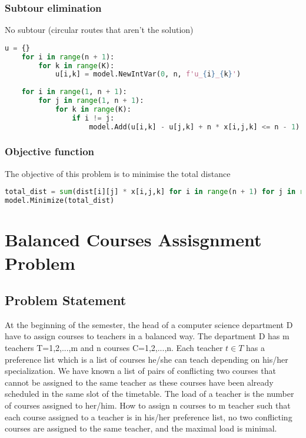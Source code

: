 \documentclass{article}
\begin{document}
\subsubsection{Subtour elimination}
No subtour (circular routes that aren't the solution)
\begin{lstlisting}[language=Python]
    u = {}
    for i in range(n + 1):
        for k in range(K):
            u[i,k] = model.NewIntVar(0, n, f'u_{i}_{k}')
    
    for i in range(1, n + 1):
        for j in range(1, n + 1):
            for k in range(K):
                if i != j:
                    model.Add(u[i,k] - u[j,k] + n * x[i,j,k] <= n - 1)
\end{lstlisting}

\subsubsection{Objective function}
The objective of this problem is to minimise the total distance
\begin{lstlisting}[language=Python]
total_dist = sum(dist[i][j] * x[i,j,k] for i in range(n + 1) for j in range(n + 1) for k in range(K) if i != j)
model.Minimize(total_dist)
\end{lstlisting}

\pagebreak

\section{Balanced Courses Assisgnment Problem}
\subsection{Problem Statement}
At the beginning of the semester, the head of a computer science department D have to assign courses to teachers in a balanced way. The department D has m teachers T={1,2,...,m} and n courses C={1,2,...,n}. Each teacher $t \in T$ has a preference list which is a list of courses he/she can teach depending on his/her specialization. We have known a list of pairs of conflicting two courses that cannot be assigned to the same teacher as these courses have been already scheduled in the same slot of the timetable. The load of a teacher is the number of courses assigned to her/him. How to assign n courses to m teacher such that each course assigned to a teacher is in his/her preference list, no two conflicting courses are assigned to the same teacher, and the maximal load is minimal.
\end{document}
